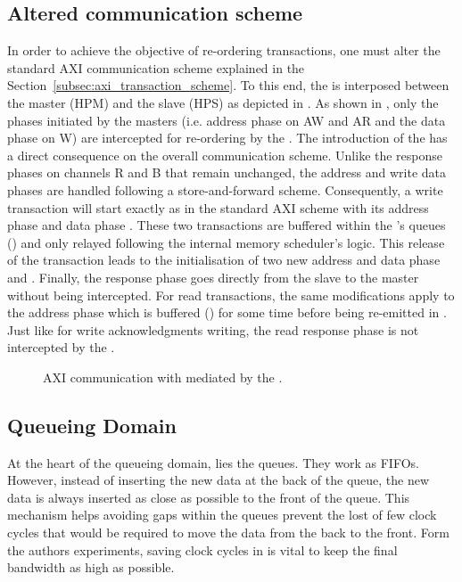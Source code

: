 \subsection{Altered communication scheme}\label{sec:communication-scheme}
In order to achieve the objective of re-ordering transactions, one
must alter the standard AXI communication scheme explained in the
Section~\ref{subsec:axi_transaction_scheme}.  To this end, the \schim
is interposed between the master (HPM) and the slave (HPS) as depicted
in . As shown in
, only the phases initiated
by the masters (i.e. address phase on AW and AR and the data phase on
W) are intercepted for re-ordering by the \schim.  The introduction of
the \schim has a direct consequence on the overall communication
scheme. Unlike the response phases on channels R and B that remain
unchanged, the address and write data phases are handled following a
store-and-forward scheme.  Consequently, a write transaction will
start exactly as in the standard AXI scheme with its address phase
 and data phase .  These two transactions are
buffered within the \schim's queues () and only relayed
following the internal memory scheduler's logic.  This release of the
transaction leads to the initialisation of two new address and data
phase  and .  Finally, the response phase
 goes directly from the slave to the master without being
intercepted.  For read transactions, the same modifications apply to
the address phase  which is buffered () for
some time before being re-emitted in .  Just like for
write acknowledgments writing, the read response phase  is
not intercepted by the \schim.

\begin{figure}
  \centering
  
  \caption{AXI communication with mediated by the \schim.}
  \label{fig:SchIM_transaction_scheme_figure}
\end{figure}

\subsection{Queueing Domain}
At the heart of the queueing domain, lies the queues. They work as FIFOs.
However, instead of inserting the new data at the back of the queue,
the new data is always inserted as close as possible to the front of the
queue. This mechanism helps avoiding gaps within the queues prevent the
lost of few clock cycles that would be required to move the data from
the back to the front. Form the authors experiments, saving clock cycles
in \schim is vital to keep the final bandwidth as high as possible.

